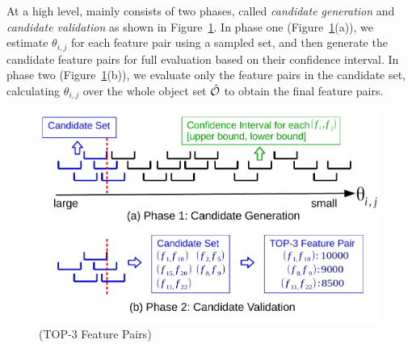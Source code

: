  At a high level, \sampling mainly consists of two phases, called {\em candidate generation} and {\em candidate validation} as shown in Figure~\ref{fig:sampling}. In phase one (Figure~\ref{fig:sampling}(a)), we estimate $\theta_{i,j}$ for each feature pair using a sampled set, and then generate the candidate feature pairs for full evaluation based on their confidence interval. In phase two (Figure~\ref{fig:sampling}(b)), we evaluate only the feature pairs in the candidate set, calculating $\theta_{i,j}$ over the whole object set $\hat{\oo}$ to obtain the final \topk feature pairs. %
\begin{figure}[t!]
  \centering
  \vspace{-2mm}
  \includegraphics[width=\linewidth]{fig/sampling.pdf}
  \vspace{-9mm}
\caption{\sampling (TOP-3 Feature Pairs)}
\vspace{-5mm}
\label{fig:sampling}
\end{figure} 

